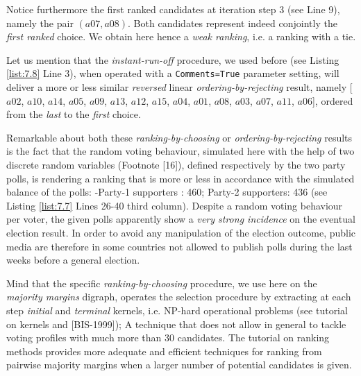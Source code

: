 Notice furthermore the first ranked candidates at iteration step 3 (see Line 9), namely the pair $(a07, a08)$. Both candidates represent indeed conjointly the \emph{first ranked} choice. We obtain here hence a \emph{weak ranking}, i.e. a ranking with a tie.

Let us mention that the \emph{instant-run-off} procedure, we used before (see Listing \ref{list:7.8} Line 3), when operated with a \texttt{Comments=True} parameter setting, will deliver a more or less similar \emph{reversed} linear \emph{ordering-by-rejecting} result, namely [$a02$, $a10$, $a14$, $a05$, $a09$, $a13$, $a12$, $a15$, $a04$, $a01$, $a08$, $a03$, $a07$, $a11$, $a06$], ordered from the \emph{last} to the \emph{first} choice.

Remarkable about both these \emph{ranking-by-choosing} or \emph{ordering-by-rejecting} results is the fact that the random voting behaviour, simulated here with the help of two discrete random variables (Footnote [16]), defined respectively by the two party polls, is rendering a ranking that is more or less in accordance with the simulated balance of the polls: -Party-1 supporters : 460;  Party-2 supporters: 436 (see Listing \ref{list:7.7} Lines 26-40 third column). Despite a random voting behaviour per voter, the given polls apparently show a \emph{very strong incidence} on the eventual election result. In order to avoid any manipulation of the election outcome, public media are therefore in some countries not allowed to publish polls during the last weeks before a general election.

\begin{svgraybox}Mind that the specific \emph{ranking-by-choosing} procedure, we use here on the \emph{majority margins} digraph, operates the selection procedure by extracting at each step \emph{initial} and \emph{terminal} kernels, i.e. NP-hard operational problems (see tutorial on kernels and [BIS-1999]); A technique that does not allow in general to tackle voting profiles with much more than 30 candidates. The tutorial on ranking methods provides more adequate and efficient techniques for ranking from pairwise majority margins when a larger number of potential candidates is given.  
\end{svgraybox} 
